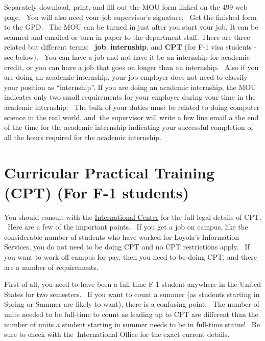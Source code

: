 \documentclass[letterpaper,10pt,english]{sphinxmanual}
\begin{document}
Separately download, print, and fill out the MOU form linked on the 499
web page.  You will also need your job supervisor's signature.  Get the
finished form to the GPD.  The MOU can be turned in just after you start
your job. It can be scanned and emailed or turn in paper to the
department staff.
There are three related but different terms:  \textbf{job}, \textbf{internship},
and \textbf{CPT} (for F-1 visa students - see below).  You can have a job and
not have it be an internship for academic credit, or you can have a job
that goes on longer than an internship.  Also if you are doing an
academic internship, your job employer does not need to classify your
position as ``internship''. If you are doing an academic internship, the
MOU indicates only two small requirements for your employer during your
time in the academic internship:  The bulk of your duties must be
related to doing computer science in the real world, and the supervisor
will write a few line email a the end of the time for the academic
internship indicating your successful completion of all the hours
required for the academic internship.


\section{Curricular Practical Training (CPT) (For F-1 students)}
\label{regulations:curricular-practical-training-cpt-for-f-1-students}
You should consult with the \href{http://www.luc.edu/oip}{International
Center} for the full legal details of CPT.
 Here are a few of the important points.  If you get a job on campus,
like the considerable number of students who have worked for Loyola's
Information Services, you do not need to be doing CPT and no CPT
restrictions apply.  If you want to work off campus for pay, then you
need to be doing CPT, and there are a number of requirements.

First of all, you need to have been a full-time F-1 student anywhere in
the United States for two semesters.  If you want to count a summer (as
students starting in Spring or Summer are likely to want), there is a
confusing point:  The number of units needed to be full-time to count as
leading up to CPT are different than the number of units a student
starting in summer needs to be in full-time status!  Be sure to check
with the International Office for the exact current details.
\end{document}
